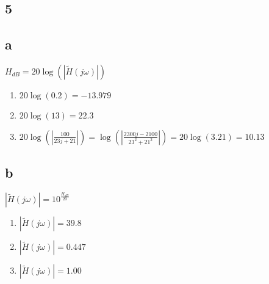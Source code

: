 \documentclass{article}
\begin{document}
\begin{multicols}{2}
\section*{5}
\subsection*{a}
$H_{dB} = 20 \log(|\tilde{H}(j\omega)|)$
\begin{enumerate}
    \item $20 \log(0.2) = \boxed{-13.979}$
    \item $20 \log(13) = \boxed{22.3}$
    \item $20 \log(|\frac{100}{23j +21}|) = \log(|\frac{2300 j - 2100}{23^2+21^2}|) = 20 \log(3.21) = \boxed{10.13}$
\end{enumerate}
\subsection*{b}
$|\tilde{H}(j\omega)| = 10^{\frac{H_{dB}}{20}}$
\begin{enumerate}
    \item $|\tilde{H}(j\omega)| = \boxed{39.8}$
    \item $|\tilde{H}(j\omega)| = \boxed{0.447}$
    \item $|\tilde{H}(j\omega)| = \boxed{1.00}$
\end{enumerate}
\end{multicols}
\end{document}
